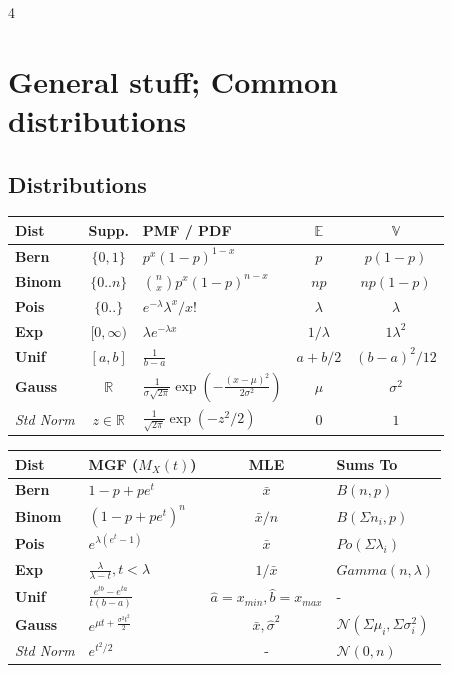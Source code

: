 \documentclass[9pt]{extarticle}
\begin{document}
\begin{multicols*}{4}
\section*{General stuff; Common distributions}



\subsection*{Distributions}
{\setlength{\tabcolsep}{2pt}
\scriptsize
\noindent\begin{tabular}{@{} l | c | l | c | c @{}}
\textbf{Dist} & \textbf{Supp.} & \textbf{PMF / PDF} & $\mathbb{E}$ & $\mathbb{V}$ \\ \hline
\textbf{Bern} & $\{0,1\}$ & $p^x(1-p)^{1-x}$ & $p$ & $p(1-p)$ \\ \hline
\textbf{Binom} & $\{0..n\}$ & $\binom{n}{x}p^x(1-p)^{n-x}$ & $np$ & $np(1-p)$ \\ \hline
\textbf{Pois} & $\{0..\}$ & $e^{-\lambda} \lambda^x / x!$ & $\lambda$ & $\lambda$ \\ \hline
\textbf{Exp} & $[0, \infty)$ & $\lambda e^{-\lambda x}$ & $1/\lambda$ & $1\lambda^2$ \\ \hline
\textbf{Unif} & $[a, b]$ & $\frac{1}{b-a}$ & $a+b/2$ & $(b-a)^2/12$ \\ \hline
\textbf{Gauss} & $\mathbb{R}$ & $\frac{1}{\sigma\sqrt{2\pi}}\exp(-\frac{(x-\mu)^2}{2\sigma^2})$ & $\mu$ & $\sigma^2$ \\ 
\textit{Std Norm} & $z \in \mathbb{R}$ & $\frac{1}{\sqrt{2\pi}}\exp(-z^2/2)$ & $0$ & $1$ \\
\end{tabular}
}

\vspace{0.1cm}
{\setlength{\tabcolsep}{2pt}
\scriptsize
\noindent\begin{tabular}{@{} l | l | c | l @{}}
\textbf{Dist} & \textbf{MGF ($M_X(t)$)} & \textbf{MLE} & \textbf{Sums To} \\ \hline
\textbf{Bern} & $1 - p + p e^t$ & $\bar{x}$ & $B(n, p)$ \\ \hline
\textbf{Binom} & $(1 - p + p e^t)^n$ & $\bar{x}/n$ & $B(\Sigma n_i, p)$ \\ \hline
\textbf{Pois} & $e^{\lambda(e^t - 1)}$ & $\bar{x}$ & $Po(\Sigma \lambda_i)$ \\ \hline
\textbf{Exp} & $\frac{\lambda}{\lambda - t}, t < \lambda$ & $1/\bar{x}$ & $Gamma(n, \lambda)$ \\ \hline
\textbf{Unif} & $\frac{e^{tb}-e^{ta}}{t(b-a)}$ & $\hat{a}{=}x_{min}, \hat{b}{=}x_{max}$ & - \\ \hline
\textbf{Gauss} & $e^{\mu t + \frac{\sigma^2 t^2}{2}}$ & $\bar{x}, \hat{\sigma}^2$ & $\mathcal{N}(\Sigma\mu_i, \Sigma\sigma_i^2)$ \\ 
\textit{Std Norm} & $e^{t^2/2}$ & - & $\mathcal{N}(0, n)$ \\
\end{tabular}
}


\end{multicols*}
\end{document}

